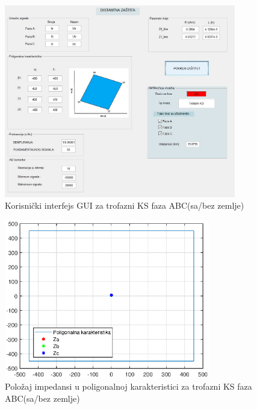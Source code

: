 \begin{figure}[H]
  \centering
  \includegraphics[width=0.9\textwidth]{Rezultati1/gui_3F_ABC_G.jpg}
  \caption{Korisnički interfejs GUI za trofazni KS faza ABC(sa/bez zemlje)}
  \label{fig:59}
\end{figure}


\begin{figure}[H]
  \centering
  \includegraphics[width=0.8\textwidth]{Rezultati1/karakteristika_3F_ABC_G.eps}
  \caption{Položaj impedansi u poligonalnoj karakteristici za trofazni KS faza ABC(sa/bez zemlje)}
  \label{fig:60}
\end{figure}

